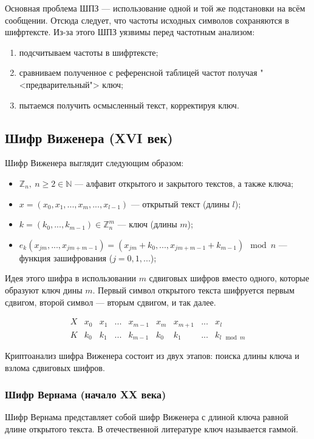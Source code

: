 \documentclass[a4paper,12pt]{article}
\begin{document}
Основная проблема ШПЗ --- использование одной и той же подстановки на всём сообщении. Отсюда следует, что частоты исходных символов сохраняются в шифртексте. Из-за этого ШПЗ уязвимы перед частотным анализом:
\begin{enumerate}
	\item подсчитываем частоты в шифртексте;
	\item сравниваем полученное с референсной таблицей частот получая "<предварительный"> ключ;
	\item пытаемся получить осмысленный текст, корректируя ключ.
\end{enumerate}


\subsection{Шифр Виженера (XVI век)}
Шифр Виженера выглядит следующим образом:
\begin{itemize}
	\item $\mathbb{Z}_n, ~ n \ge 2 \in \mathbb{N}$ --- алфавит открытого и закрытого текстов, а также ключа;
	\item $x = (x_0, x_1, ..., x_m, ..., x_{l-1})$ --- открытый текст (длины $l$);
	\item $k = (k_0, ..., k_{m-1}) \in \mathbb{Z}_n^m$ --- ключ (длины $m$);
	\item $e_k(x_{jm},...,x_{jm+m-1}) = (x_{jm}+k_0, ..., x_{jm + m - 1}+k_{m-1}) \mod n$ --- функция зашифрования ($j=0,1,...$);
\end{itemize}

Идея этого шифра в использовании $m$ сдвиговых шифров вместо одного, которые образуют ключ дины $m$. Первый символ открытого текста шифруется первым сдвигом, второй символ --- вторым сдвигом, и так далее.   

$$
\begin{matrix}
	X & x_0& x_1& ...& x_{m-1}& x_m& x_{m+1}& ...& x_l\\
	K & k_0& k_1& ...& k_{m-1}& k_0& k_1    & ...& k_{l\mod m}
\end{matrix}
$$

Криптоанализ шифра Виженера состоит из двух этапов: поиска длины ключа и взлома сдвиговых шифров.

\subsubsection{Шифр Вернама (начало XX века)}
Шифр Вернама представляет собой шифр Виженера с длиной ключа равной длине открытого текста. В отечественной литературе ключ называется гаммой.
\end{document}
